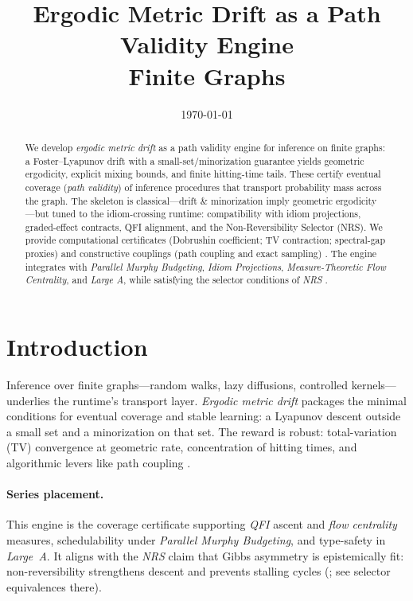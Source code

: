 \documentclass[11pt]{article}
\title{\textbf{Ergodic Metric Drift as a Path Validity Engine}\\[0.25em]\large Finite Graphs}
\author{}
\date{\today}
\theoremstyle{plain}
\theoremstyle{definition}
\theoremstyle{remark}
\newcommand{\1}{\mathds{1}}
\begin{document}
\maketitle

\begin{abstract}
We develop \emph{ergodic metric drift} as a path validity engine for inference on finite graphs: a Foster--Lyapunov drift with a small-set/minorization guarantee yields geometric ergodicity, explicit mixing bounds, and finite hitting-time tails. These certify eventual coverage (\emph{path validity}) of inference procedures that transport probability mass across the graph. The skeleton is classical---drift \& minorization imply geometric ergodicity \cite{MeynTweedie2009,RobertsRosenthal2004,Nummelin1984}---but tuned to the idiom-crossing runtime: compatibility with idiom projections, graded-effect contracts, QFI alignment, and the Non-Reversibility Selector (NRS). We provide computational certificates (Dobrushin coefficient; TV contraction; spectral-gap proxies) and constructive couplings (path coupling and exact sampling) \cite{Seneta2006,LevinPeresWilmer2009,BubleyDyer1997,ProppWilson1996}. The engine integrates with \emph{Parallel Murphy Budgeting}, \emph{Idiom Projections}, \emph{Measure-Theoretic Flow Centrality}, and \emph{Large A}, while satisfying the selector conditions of \emph{NRS} \cite{MurphyBudget2025,IdiomProjections2025,FlowCentrality2025,GradedEffects2025,NRSinPrep2025}.
\end{abstract}

\section{Introduction}
Inference over finite graphs---random walks, lazy diffusions, controlled kernels---underlies the runtime's transport layer. \emph{Ergodic metric drift} packages the minimal conditions for eventual coverage and stable learning: a Lyapunov descent outside a small set and a minorization on that set. The reward is robust: total-variation (TV) convergence at geometric rate, concentration of hitting times, and algorithmic levers like path coupling \cite{MeynTweedie2009,RobertsRosenthal2004,BubleyDyer1997}.

\paragraph{Series placement.}
This engine is the coverage certificate supporting \emph{QFI} ascent and \emph{flow centrality} measures, schedulability under \emph{Parallel Murphy Budgeting}, and type-safety in \emph{Large~A}. It aligns with the \emph{NRS} claim that Gibbs asymmetry is epistemically fit: non-reversibility strengthens descent and prevents stalling cycles (\cite{NRSinPrep2025}; see selector equivalences there).
\end{document}
